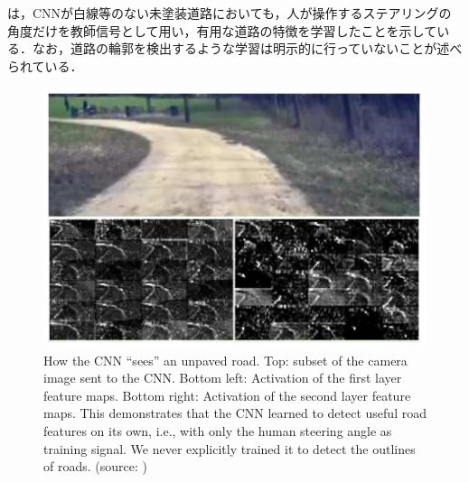 \newpage

     は，CNNが白線等のない未塗装道路においても，人が操作するステアリングの角度だけを教師信号として用い，有用な道路の特徴を学習したことを示している．なお，道路の輪郭を検出するような学習は明示的に行っていないことが述べられている．

     \begin{figure}[h]
          \centering
          \includegraphics[keepaspectratio, scale=0.80] {images/pdf/bojarski_CNN}
          \captionsetup{justification=raggedright} %
          \caption[How the CNN ``sees'' an unpaved road. Top: subset of the camera image sent to the CNN. Bottom left: Activation of the first layer feature maps. Bottom right: Activation of the second layer feature maps. This demonstrates that the CNN learned to detect useful road features on its own, i.e., with only the human steering angle as training signal. We never explicitly trained it to detect the outlines of roads.]{How the CNN ``sees'' an unpaved road. Top: subset of the camera image sent to the CNN. Bottom left: Activation of the first layer feature maps. Bottom right: Activation of the second layer feature maps. This demonstrates that the CNN learned to detect useful road features on its own, i.e., with only the human steering angle as training signal. We never explicitly trained it to detect the outlines of roads. (source: \cite{bojarski})}
          \label{Fig:bojarski_CNN}
     \end{figure}

\newpage
